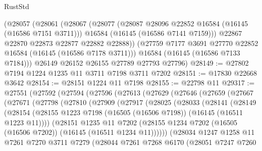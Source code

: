 \begin{lexlean}{RustStd}
\begin{coremodule}
      (@28057
        (@28061
          (@28067
            (@28077
              (@28087 @28096 @22852 @16584 (@16145 (@16586 @7151 @3711)))
              @16584
              (@16145 (@16586 @7141 @7159)))
            @22867
            @22870
            @22873
            @22877
            @22882
            @22888))
        (@27759 @7177 @3691 @27770 @22852 @16584 (@16145 (@16586 @7178 @3711)))
        @16584
        (@16145 (@16586 @7133 @7184)))
      @26149
      @26152
      @26155
      @27789
      @27793
      @27796)
@28149 := @27802 @7194 @1224 @1235 @11 @3711 @7198 @3711 @7202
@28151 := @17830 @22668 @3642
@28154 := @28151 @1224 @11 @7198
@28155 := @22798 @11
@29317 := @27551
    (@27592
      (@27594
        (@27596
          (@27613
            (@27629
              (@27646
                (@27659
                  (@27667
                    (@27671
                      (@27798
                        (@27810
                          (@27909
                            (@27917
                              (@28025
                                (@28033
                                  (@28141
                                    (@28149
                                      (@28154
                                        (@28155
                                          @1223
                                          @7198
                                          (@16505 (@16506 @7198))
                                          (@16145 (@16511 @1223 @11))))
                                      (@28151
                                        @1235
                                        @11
                                        @7202
                                        (@28155
                                          @1234
                                          @7202
                                          (@16505 (@16506 @7202))
                                          (@16145 (@16511 @1234 @11))))))
                                  (@28034
                                    @1247
                                    @1258
                                    @11
                                    @7261
                                    @7270
                                    @3711
                                    @7279
                                    (@28044
                                      @7261
                                      @7268
                                      @6170
                                      (@28051
                                        @7247
                                        @7260

\end{coremodule}
\end{lexlean}
